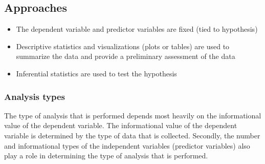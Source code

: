 \documentclass[
  letterpaper,
]{latex/krantz}
\providecommand{\tightlist}{%
  \setlength{\itemsep}{0pt}\setlength{\parskip}{0pt}}\usepackage{longtable,booktabs,array}
\begin{document}
\hypertarget{ida-approaches}{%
\subsection{Approaches}\label{ida-approaches}}

\begin{itemize}
\tightlist
\item
  The dependent variable and predictor variables are fixed (tied to
  hypothesis)
\item
  Descriptive statistics and visualizations (plots or tables) are used
  to summarize the data and provide a preliminary assessment of the data
\item
  Inferential statistics are used to test the hypothesis
\end{itemize}

\hypertarget{ida-analysis-types}{%
\subsubsection{Analysis types}\label{ida-analysis-types}}

The type of analysis that is performed depends most heavily on the
informational value of the dependent variable. The informational value
of the dependent variable is determined by the type of data that is
collected. Secondly, the number and informational types of the
independent variables (predictor variables) also play a role in
determining the type of analysis that is performed.
\end{document}
